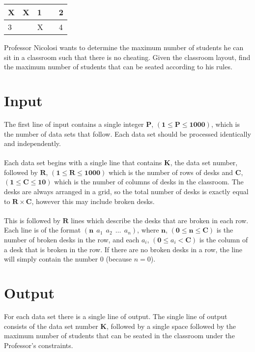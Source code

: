 \documentclass[11pt]{article}
\begin{document}
\begin{center}
\setlength{\tabcolsep}{8pt}
\renewcommand{\arraystretch}{1.5}
\begin{tabular}{ | m{6pt} | m{6pt} | m{6pt} | m{6pt} | m{6pt} | }
		\hline
 		X & X & 1 & & 2 \\ \hline
		3 & & X & & 4 \\
 		\hline
\end{tabular}
\end{center}
\bigskip
Professor Nicolosi wants to determine the maximum number of students he can sit
in a classroom such that there is no cheating. Given the classroom layout,
find the maximum number of students that can be seated according to his rules.

\section{Input}
The first line of input contains a single integer $\boldsymbol{P}$, $(\boldsymbol{1} \le \boldsymbol{P} \le \boldsymbol{1000})$, which is the number of data sets that follow. Each
data set should be processed identically and independently.
\\\\
Each data set begins with a single line that contains $\boldsymbol{K}$, the data
set number, followed by $\boldsymbol{R}$, $(\boldsymbol{1} \le \boldsymbol{R} \le \boldsymbol{1000})$ which
is the number of rows of desks and $\boldsymbol{C}$,
$(\boldsymbol{1} \le \boldsymbol{C} \le \boldsymbol{10})$
which is the number of columns of desks in the classroom. The desks are always
arranged in a grid, so the total number of desks is exactly equal to
$\boldsymbol{R} \times \boldsymbol{C}$, however this may include broken desks.
\\\\
This is followed by $\boldsymbol{R}$ lines which describe the desks that are
broken in each row. Each line is of the format $(\boldsymbol{n}\ \ a_1\ \ a_2\ \ \ldots\ \ a_n)$,
where $\boldsymbol{n}$, $(\boldsymbol{0} \le \boldsymbol{n} \le \boldsymbol{C})$
is the number of broken desks in the row, and each $a_i$,
$(\boldsymbol{0} \le a_i < \boldsymbol{C})$ is the column of
a desk that is broken in the row. If there are no broken desks in a row, the
line will simply contain the number $0$ (because $n = 0$).

\section{Output}
For each data set there is a single line of output. The single line of output
consists of the data set number $\boldsymbol{K}$, followed by a single space
followed by the maximum number of students that can be seated in the classroom
under the Professor's constraints.
\end{document}
